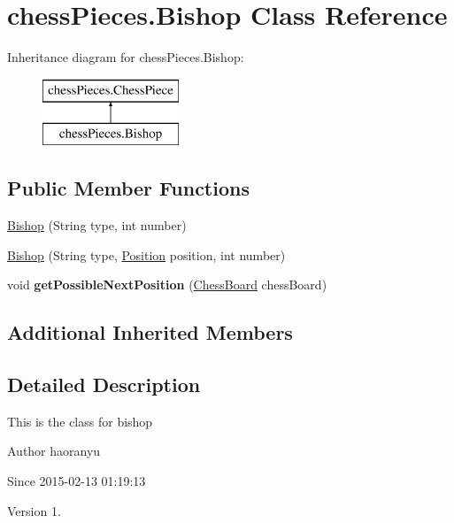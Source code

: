 \hypertarget{classchess_pieces_1_1_bishop}{\section{chess\+Pieces.\+Bishop Class Reference}
\label{classchess_pieces_1_1_bishop}
}
Inheritance diagram for chess\+Pieces.\+Bishop\+:\begin{figure}[H]
\begin{center}
\leavevmode
\includegraphics[height=2.000000cm]{classchess_pieces_1_1_bishop}
\end{center}
\end{figure}
\subsection*{Public Member Functions}
\begin{DoxyCompactItemize}
\item 
\hyperlink{classchess_pieces_1_1_bishop_ac939ccc917297b61fa1bc86f38bfebda}{Bishop} (String type, int number)
\item 
\hyperlink{classchess_pieces_1_1_bishop_acf607ff6a59585a2bd77f9737fa51c20}{Bishop} (String type, \hyperlink{classmodels_1_1_position}{Position} position, int number)
\item 
\hypertarget{classchess_pieces_1_1_bishop_a671e91ec066dae90ba26d390d2831892}{void {\bfseries get\+Possible\+Next\+Position} (\hyperlink{classmodels_1_1_chess_board}{Chess\+Board} chess\+Board)}\label{classchess_pieces_1_1_bishop_a671e91ec066dae90ba26d390d2831892}

\end{DoxyCompactItemize}
\subsection*{Additional Inherited Members}


\subsection{Detailed Description}
This is the class for bishop \begin{DoxyAuthor}{Author}
haoranyu 
\end{DoxyAuthor}
\begin{DoxySince}{Since}
2015-\/02-\/13 01\+:19\+:13 
\end{DoxySince}
\begin{DoxyVersion}{Version}
1. 
\end{DoxyVersion}


